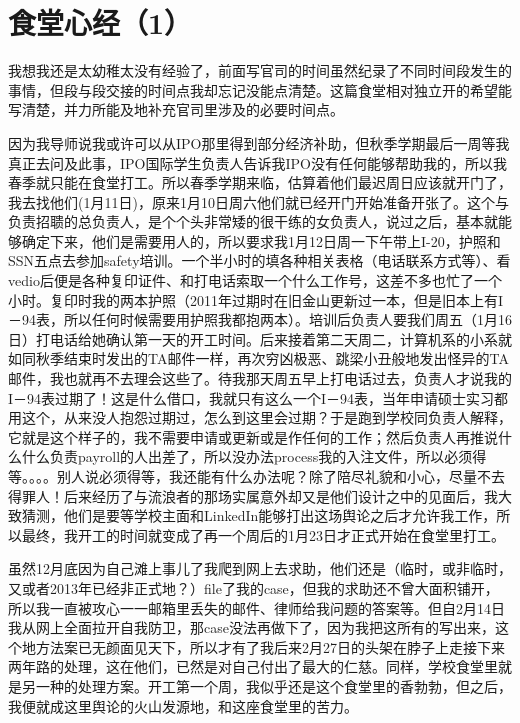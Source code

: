 \documentclass[12pt]{book}
\begin{document}
\section{食堂心经（1）}
\label{sec-41-1}
我想我还是太幼稚太没有经验了，前面写官司的时间虽然纪录了不同时间段发生的事情，但段与段交接的时间点我却忘记没能点清楚。这篇食堂相对独立开的希望能写清楚，并力所能及地补充官司里涉及的必要时间点。

因为我导师说我或许可以从IPO那里得到部分经济补助，但秋季学期最后一周等我真正去问及此事，IPO国际学生负责人告诉我IPO没有任何能够帮助我的，所以我春季就只能在食堂打工。所以春季学期来临，估算着他们最迟周日应该就开门了，我去找他们(1月11日)，原来1月10日周六他们就已经开门开始准备开张了。这个与负责招聩的总负责人，是个个头非常矮的很干练的女负责人，说过之后，基本就能够确定下来，他们是需要用人的，所以要求我1月12日周一下午带上I-20，护照和SSN五点去参加safety培训。一个半小时的填各种相关表格（电话联系方式等）、看vedio后便是各种复印证件、和打电话索取一个什么工作号，这差不多也忙了一个小时。复印时我的两本护照（2011年过期时在旧金山更新过一本，但是旧本上有I－94表，所以任何时候需要用护照我都抱两本）。培训后负责人要我们周五（1月16日）打电话给她确认第一天的开工时间。后来接着第二天周二，计算机系的小系就如同秋季结束时发出的TA邮件一样，再次穷凶极恶、跳梁小丑般地发出怪异的TA邮件，我也就再不去理会这些了。待我那天周五早上打电话过去，负责人才说我的I－94表过期了！这是什么借口，我就只有这么一个I－94表，当年申请硕士实习都用这个，从来没人抱怨过期过，怎么到这里会过期？于是跑到学校同负责人解释，它就是这个样子的，我不需要申请或更新或是作任何的工作；然后负责人再推说什么什么负责payroll的人出差了，所以没办法process我的入注文件，所以必须得等。。。。别人说必须得等，我还能有什么办法呢？除了陪尽礼貌和小心，尽量不去得罪人！后来经历了与流浪者的那场实属意外却又是他们设计之中的见面后，我大致猜测，他们是要等学校主面和LinkedIn能够打出这场舆论之后才允许我工作，所以最终，我开工的时间就变成了再一个周后的1月23日才正式开始在食堂里打工。

虽然12月底因为自己滩上事儿了我爬到网上去求助，他们还是（临时，或非临时，又或者2013年已经非正式地？）file了我的case，但我的求助还不曾大面积铺开，所以我一直被攻心一一邮箱里丢失的邮件、律师给我问题的答案等。但自2月14日我从网上全面拉开自我防卫，那case没法再做下了，因为我把这所有的写出来，这个地方法案已无颜面见天下，所以才有了我后来2月27日的头架在脖子上走接下来两年路的处理，这在他们，已然是对自己付出了最大的仁慈。同样，学校食堂里就是另一种的处理方案。开工第一个周，我似乎还是这个食堂里的香勃勃，但之后，我便就成这里舆论的火山发源地，和这座食堂里的苦力。
\end{document}

